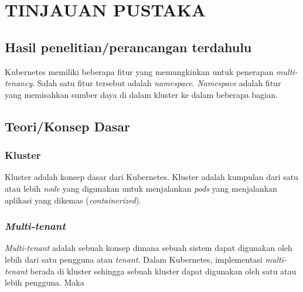 \chapter{TINJAUAN PUSTAKA}

\section{Hasil penelitian/perancangan terdahulu}

Kubernetes memiliki beberapa fitur yang memungkinkan untuk penerapan
\emph{multi-tenancy}. Salah satu fitur tersebut adalah \emph{namespace}.
\emph{Namespace} adalah fitur yang memisahkan sumber daya di dalam kluster
ke dalam beberapa bagian.

\section{Teori/Konsep Dasar}

\subsection{Kluster}

Kluster adalah konsep dasar dari Kubernetes. Kluster adalah kumpulan dari
satu atau lebih \emph{node} yang digunakan untuk menjalankan \emph{pods} yang
menjalankan aplikasi yang dikemas (\emph{containerized}). 

\subsection{\emph{Multi-tenant}}

\emph{Multi-tenant} adalah sebuah konsep dimana sebuah sistem dapat digunakan
oleh lebih dari satu pengguna atau \emph{tenant}. Dalam Kubernetes, implementasi
\emph{multi-tenant} berada di kluster sehingga sebuah kluster dapat digunakan
oleh satu atau lebih pengguna. Maka \parencite{oliva_multi-tenancy_2024}

